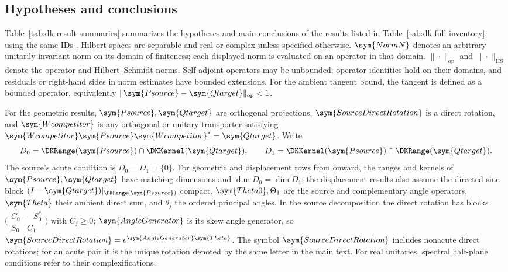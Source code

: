 \subsection{Hypotheses and conclusions}
\label{app:dk-result-summaries}

Table~\ref{tab:dk-result-summaries} summarizes the hypotheses and main
conclusions of the \DKResultCount{} results listed in
Table~\ref{tab:dk-full-inventory}, using the same IDs
\citep[Sections~2--8]{davis1970rotation}.
Hilbert spaces are separable and real or complex unless specified otherwise.
$\sym{NormN}$ denotes an arbitrary unitarily invariant norm on its domain of
finiteness; each displayed norm is evaluated on an operator in that domain.
$\|\cdot\|_{\mathrm{op}}$ and $\|\cdot\|_{\mathrm{HS}}$ denote the operator
and Hilbert--Schmidt norms. Self-adjoint operators may be unbounded:
operator identities hold on their domains, and residuals or right-hand sides
in norm estimates have bounded extensions.
For the ambient tangent bound, the tangent is defined as a bounded operator,
equivalently $\|\sym{Psource}-\sym{Qtarget}\|_{\mathrm{op}}<1$.

For the geometric results, $\sym{Psource},\sym{Qtarget}$ are orthogonal
projections, $\sym{SourceDirectRotation}$ is a direct rotation, and
$\sym{Wcompetitor}$ is any orthogonal or unitary transporter satisfying
$\sym{Wcompetitor}\sym{Psource}\sym{Wcompetitor}^*=\sym{Qtarget}$.
Write
\[
 D_0=\DKRange(\sym{Psource})\cap\DKKernel(\sym{Qtarget}),\qquad
 D_1=\DKKernel(\sym{Psource})\cap\DKRange(\sym{Qtarget}).
\]
The source's acute condition is $D_0=D_1=\{0\}$.
For geometric and displacement rows from  onward,
the ranges and kernels of
$\sym{Psource},\sym{Qtarget}$ have matching dimensions and
$\dim D_0=\dim D_1$; the displacement results also assume
the directed sine block
$(I-\sym{Qtarget})|_{\DKRange(\sym{Psource})}$ compact.
$\sym{Theta0},\Theta_1$ are the source and complementary angle operators,
$\sym{Theta}$ their ambient direct sum, and $\theta_j$ the ordered principal
angles. In the source decomposition the direct rotation has blocks
$\bigl(\begin{smallmatrix}C_0&-S_0^*\\S_0&C_1\end{smallmatrix}\bigr)$
with $C_j\ge0$; $\sym{AngleGenerator}$ is its skew angle generator, so
$\sym{SourceDirectRotation}=e^{\sym{AngleGenerator}\sym{Theta}}$.
The symbol $\sym{SourceDirectRotation}$ includes nonacute direct rotations;
for an acute pair it is the unique rotation denoted by the same letter
in the main text.
For real unitaries, spectral half-plane conditions refer to their
complexifications.

